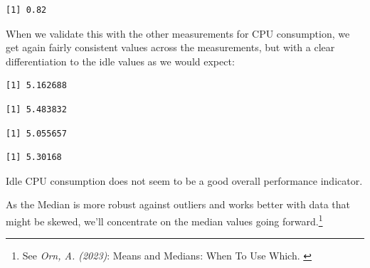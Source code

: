 \begin{verbatim}
[1] 0.82
\end{verbatim}

When we validate this with the other measurements for CPU consumption, we get again fairly consistent values across the measurements, but with a clear differentiation to the idle values as we would expect:

\begin{Shaded}
\begin{Highlighting}[]
\SpecialCharTok{\$}
\end{Highlighting}
\end{Shaded}

\begin{verbatim}
[1] 5.162688
\end{verbatim}

\begin{Shaded}
\begin{Highlighting}[]
\SpecialCharTok{\$}
\end{Highlighting}
\end{Shaded}

\begin{verbatim}
[1] 5.483832
\end{verbatim}

\begin{Shaded}
\begin{Highlighting}[]
\SpecialCharTok{\$}
\end{Highlighting}
\end{Shaded}

\begin{verbatim}
[1] 5.055657
\end{verbatim}

\begin{Shaded}
\begin{Highlighting}[]
\SpecialCharTok{\$}
\end{Highlighting}
\end{Shaded}

\begin{verbatim}
[1] 5.30168
\end{verbatim}

Idle CPU consumption does not seem to be a good overall performance indicator.

As the Median is more robust against outliers and works better with data that might be skewed, we'll concentrate on the median values going forward.\footnote{See \textit{Orn, A. (2023)}: Means and Medians: When To Use Which. \cite{meansMedians}}

